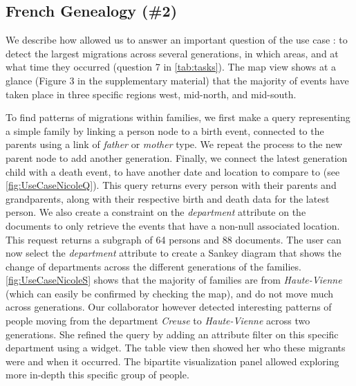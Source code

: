\subsection{French Genealogy (\#2)}

We describe how \name allowed us to answer an important question of the use case \nicole: to detect the largest migrations across several generations, in which areas, and at what time they occurred (question 7 in \autoref{tab:tasks}).
The map view shows at a glance (Figure 3 in the supplementary material) that the majority of events have taken place in three specific regions west, mid-north, and mid-south.

To find patterns of migrations within families, we first make a query representing a simple family by linking a person node to a birth event, connected to the parents using a link of \textit{father} or \textit{mother} type. We repeat the process to the new parent node to add another generation. Finally, we connect the latest generation child with a death event, to have another date and location to compare to (see \autoref{fig:UseCaseNicoleQ}). This query returns every person with their parents and grandparents, along with their respective birth and death data for the latest person. We also create a constraint on the \textit{department} attribute on the documents to only retrieve the events that have a non-null associated location. This request returns a subgraph of 64 persons and 88 documents. The user can now select the \textit{department} attribute to create a Sankey diagram that shows the change of departments across the different generations of the families. \autoref{fig:UseCaseNicoleS} shows that the majority of families are from \textit{Haute-Vienne} (which can easily be confirmed by checking the map), and do not move much across generations. Our collaborator however detected interesting patterns of people moving from the department \textit{Creuse} to \textit{Haute-Vienne} across two generations. She refined the query by adding an attribute filter on this specific department using a widget. The table view then showed her who these migrants were and when it occurred. The bipartite visualization panel allowed exploring more in-depth this specific group of people. %


